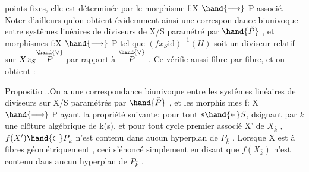 
points fixes, elle est déterminée  par le morphisme f:X $\hand{\longrightarrow}$ P
associé. Noter d'ailleurs qu'on obtient évidemment ainsi une correspon
dance biunivoque entre systêmes linéaires de diviseurs de X/S paramétré
par $\hand{\check{P}}$ , et morphismes f:X $\hand{\longrightarrow}$ P tel que $(fx_S\mathrm{id})^{-1}(\underline{H})$ soit un
diviseur  relatif sur $Xx_S\overset{\hand{\vee}}{P}$ par rapport à $\overset{\hand{\vee}}{P}$ . Ce  
 vérifie aussi fibre par fibre, et on obtient :

\uline{Propositio} ..On a une correspondance biunivoque entre les 
systêmes linéaires  de diviseurs sur X/S paramétrés par $\hand{\check{P}}$ , et les morphis
mes f: X $\hand{\longrightarrow}$ P ayant la propriété suivante: pour tout $s\hand{\in} S$, dsignant
par $\bar{k}$ une clôture algébrique de k(s), et pour tout cycle premier associé
X' de $X_{\bar{k}}$ , $f(X')\hand{\subset} P_{\bar{k}}$ n'est contenu dans aucun hyperplan de $P_{\bar{k}}$ .
\hand{(}Lorsque X est à fibres géométriquement  , ceci 
 s'énoncé simplement en disant que $f(X_{\bar{k}})$ n'est contenu dans aucun
hyperplan de $P_{\bar{k}}$ \hand{)}.


